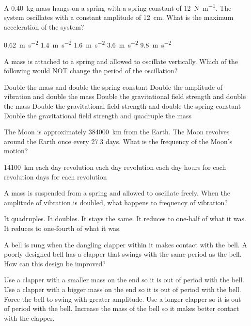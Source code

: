 \documentclass{../../../oss-ap12ibhl}
\begin{document}
\genheader
{}

\begin{questions}

  \question A \SI{.40}{\kilo\gram} mass hangs on a spring with a spring
  constant of \SI{12}{\newton\per\metre}. The system oscillates with a constant
  amplitude of \SI{12}{\centi\metre}. What is the maximum acceleration of the
  system?
  \begin{choices}
    \choice\SI{.62}{\metre\per\second\squared}
    \choice\SI{1.4}{\metre\per\second\squared}
    \choice\SI{1.6}{\metre\per\second\squared}
    \choice\SI{3.6}{\metre\per\second\squared}
    \choice\SI{9.8}{\metre\per\second\squared}
  \end{choices}

  \question A mass is attached to a spring and allowed to oscillate vertically.
  Which of the following would NOT change the period of the oscillation?
  \begin{choices}
    \choice Double the mass and double the spring constant
    \choice Double the amplitude of vibration and double the mass
    \choice Double the gravitational field strength and double the mass
    \choice Double the gravitational field strength and double the spring
    constant
    \choice Double the gravitational field strength and quadruple the mass
  \end{choices}
    
  \question The Moon is approximately \SI{384000}{\kilo\metre} from the Earth.
  The Moon revolves around the Earth once every 27.3 days. What is the frequency
  of the Moon's motion?
  \begin{choices}
    \choice \SI{14100}{\kilo\metre} each day
     revolution each day
     revolution each day
     hours for each revolution
     days for each revolution
  \end{choices}

  \question A mass is suspended from a spring and allowed to oscillate freely.
  When the amplitude of vibration is doubled, what happens to frequency of
  vibration?
  \begin{choices}
    \choice It quadruples.
    \choice It doubles.
    \choice It stays the same.
    \choice It reduces to one-half of what it was.
    \choice It reduces to one-fourth of what it was.
  \end{choices}
    
  \question A bell is rung when the dangling clapper within it makes contact
  with the bell. A poorly designed bell has a clapper that swings with the same
  period as the bell. How can this design be improved?
  \begin{choices}
    \choice Use a clapper with a smaller mass on the end so it is out of period
    with the bell.
    \choice Use a clapper with a bigger mass on the end so it is out of period
    with the bell.
    \choice Force the bell to swing with greater amplitude.
    \choice Use a longer clapper so it is out of period with the bell.
    \choice Increase the mass of the bell so it makes better contact with the
    clapper.
  \end{choices}


\end{questions}
\end{document}
